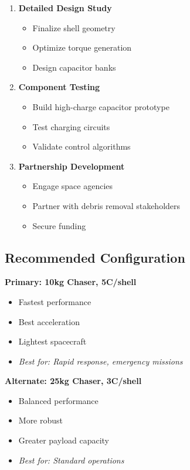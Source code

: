 \documentclass[11pt,a4paper]{article}
\begin{document}
\begin{enumerate}[leftmargin=*]
    \item \textbf{Detailed Design Study}
    \begin{itemize}
        \item Finalize shell geometry
        \item Optimize torque generation
        \item Design capacitor banks
    \end{itemize}

    \item \textbf{Component Testing}
    \begin{itemize}
        \item Build high-charge capacitor prototype
        \item Test charging circuits
        \item Validate control algorithms
    \end{itemize}

    \item \textbf{Partnership Development}
    \begin{itemize}
        \item Engage space agencies
        \item Partner with debris removal stakeholders
        \item Secure funding
    \end{itemize}
\end{enumerate}

\subsection{Recommended Configuration}

\textbf{Primary: 10kg Chaser, 5C/shell}
\begin{itemize}[leftmargin=*]
    \item Fastest performance
    \item Best acceleration
    \item Lightest spacecraft
    \item \textit{Best for: Rapid response, emergency missions}
\end{itemize}

\textbf{Alternate: 25kg Chaser, 3C/shell}
\begin{itemize}[leftmargin=*]
    \item Balanced performance
    \item More robust
    \item Greater payload capacity
    \item \textit{Best for: Standard operations}
\end{itemize}
\end{document}

